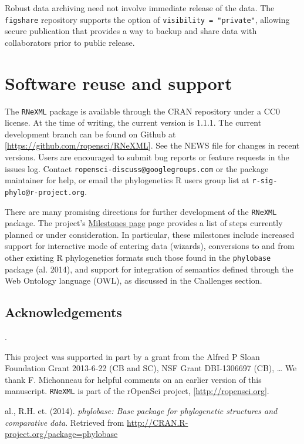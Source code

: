 \documentclass[author-year, review, 11pt]{components/elsarticle} %
\begin{document}
Robust data archiving need not involve immediate release of the data.
The \texttt{figshare} repository supports the option of
\texttt{visibility = "private"}, allowing secure publication that
provides a way to backup and share data with collaborators prior to
public release.

\section{Software reuse and support}\label{software-reuse-and-support}

The \texttt{RNeXML} package is available through the CRAN repository
under a CC0 license. At the time of writing, the current version is
1.1.1. The current development branch can be found on Github at
{[}\url{https://github.com/ropensci/RNeXML}{]}. See the NEWS file for
changes in recent versions. Users are encouraged to submit bug reports
or feature requests in the issues log. Contact
\texttt{ropensci-discuss@googlegroups.com} or the package maintainer for
help, or email the phylogenetics R users group list at
\texttt{r-sig-phylo@r-project.org}.

There are many promising directions for further development of the
\texttt{RNeXML} package. The project's
\href{https://github.com/ropensci/RNeXML/issues/milestones}{Milestones
page} page provides a list of steps currently planned or under
consideration. In particular, these milestones include increased support
for interactive mode of entering data (wizards), conversions to and from
other existing R phylogenetics formats such those found in the
\texttt{phylobase} package (al. 2014), and support for integration of
semantics defined through the Web Ontology language (OWL), as discussed
in the Challenges section.

\subsection{Acknowledgements}\label{acknowledgements}

.

This project was supported in part by a grant from the Alfred P Sloan
Foundation Grant 2013-6-22 (CB and SC), NSF Grant DBI-1306697 (CB),
\ldots{} We thank F. Michonneau for helpful comments on an earlier
version of this manuscript. \texttt{RNeXML} is part of the rOpenSci
project, {[}\url{http://ropensci.org}{]}.

al., R.H. et. (2014). \emph{phylobase: Base package for phylogenetic
structures and comparative data}. Retrieved from
\url{http://CRAN.R-project.org/package=phylobase}
\end{document}
